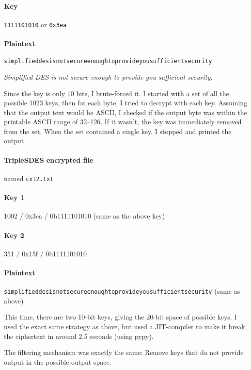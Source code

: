 \documentclass[a4paper,english,12pt]{article}
\begin{document}
\paragraph{Key} \texttt{1111101010} or \texttt{0x3ea}

\paragraph{Plaintext}
\texttt{simplifieddesisnotsecureenoughtoprovideyousufficientsecurity}

\begin{center}
\textit{Simplified DES is not secure enough to provide you sufficient security.}
\end{center}

Since the key is only 10 bits, I brute-forced it. I started with a set of all
the possible 1023 keys, then for each byte, I tried to decrypt with each key.
Assuming that the output text would be ASCII, I checked if the output byte was
within the printable ASCII range of 32--126. If it wasn't, the key was
immediately removed from the set. When the set contained a single key, I
stopped and printed the output.

\paragraph{TripleSDES encrypted file} named \texttt{cxt2.txt}

\paragraph{Key 1} 1002 / 0x3ea / 0b1111101010 (same as the above key)
\paragraph{Key 2} 351 / 0x15f / 0b1111101010
\paragraph{Plaintext}
\texttt{simplifieddesisnotsecureenoughtoprovideyousufficientsecurity} (same as
above)

This time, there are two 10-bit keys, giving the 20-bit space of possible keys.
I used the exact same strategy as above, but used a JIT-compiler to make it
break the ciphertext in around 2.5 seconds (using pypy).

The filtering mechanism was exactly the same: Remove keys that do not provide
output in the possible output space.
\end{document}
